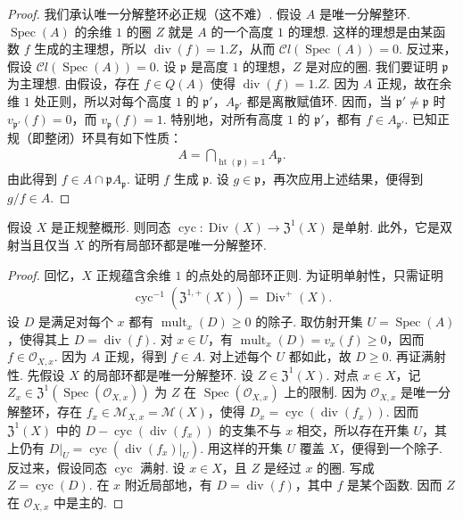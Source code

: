 \begin{proof}
我们承认唯一分解整环必正规（这不难）. 假设 $A$ 是唯一分解整环. $\operatorname{Spec}(A)$ 的余维 $1$ 的圈 $Z$ 就是 $A$ 的一个高度 $1$ 的理想. 这样的理想是由某函数 $f$ 生成的主理想，所以 $\operatorname{div}(f)=1.Z$，从而 $\mathcal Cl(\operatorname{Spec}(A))=0$.
反过来，假设 $\mathcal Cl(\operatorname{Spec}(A))=0$. 设 $\mathfrak p$ 是高度 $1$ 的理想，$Z$ 是对应的圈. 我们要证明 $\mathfrak p$ 为主理想. 由假设，存在 $f\in Q(A)$ 使得 $\operatorname{div}(f)=1.Z$. 因为 $A$ 正规，故在余维 $1$ 处正则，所以对每个高度 $1$ 的 $\mathfrak p'$，$A_{\mathfrak p'}$ 都是离散赋值环. 因而，当 $\mathfrak p'\ne\mathfrak p$ 时 $v_{\mathfrak p'}(f)=0$，而 $v_{\mathfrak p}(f)=1$. 特别地，对所有高度 $1$ 的 $\mathfrak p'$，都有 $f\in A_{\mathfrak p'}$. 已知正规（即整闭）环具有如下性质：
\begin{align*}
A=\bigcap_{\operatorname{ht}(\mathfrak p)=1}A_{\mathfrak p}.
\end{align*}
由此得到 $f\in A\cap\mathfrak pA_{\mathfrak p}$. 证明 $f$ 生成 $\mathfrak p$. 设 $g\in\mathfrak p$，再次应用上述结果，便得到 $g/f\in A$.
\end{proof}
\begin{theorem}\label{item:ag-1-3-7}
假设 $X$ 是正规整概形. 则同态 $\operatorname{cyc}:\operatorname{Div}(X)\longrightarrow\mathfrak Z^1(X)$ 是单射. 此外，它是双射当且仅当 $X$ 的所有局部环都是唯一分解整环.
\end{theorem}
\begin{proof}
回忆，$X$ 正规蕴含余维 $1$ 的点处的局部环正则. 为证明单射性，只需证明
\begin{align*}
\operatorname{cyc}^{-1}(\mathfrak Z^{1,+}(X))=\operatorname{Div}^+(X).
\end{align*}
设 $D$ 是满足对每个 $x$ 都有 $\operatorname{mult}_x(D)\geqslant0$ 的除子. 取仿射开集 $U=\operatorname{Spec}(A)$，使得其上 $D=\operatorname{div}(f)$. 对 $x\in U$，有 $\operatorname{mult}_x(D)=v_x(f)\geqslant0$，因而 $f\in\mathcal O_{X,x}$. 因为 $A$ 正规，得到 $f\in A$. 对上述每个 $U$ 都如此，故 $D\geqslant0$.
再证满射性. 先假设 $X$ 的局部环都是唯一分解整环. 设 $Z\in\mathfrak Z^1(X)$. 对点 $x\in X$，记 $Z_x\in\mathfrak Z^1(\operatorname{Spec}(\mathcal O_{X,x}))$ 为 $Z$ 在 $\operatorname{Spec}(\mathcal O_{X,x})$ 上的限制. 因为 $\mathcal O_{X,x}$ 是唯一分解整环，存在 $f_x\in\mathcal M_{X,x}=\mathcal M(X)$，使得 $D_x=\operatorname{cyc}(\operatorname{div}(f_x))$. 因而 $\mathfrak Z^1(X)$ 中的 $D-\operatorname{cyc}(\operatorname{div}(f_x))$ 的支集不与 $x$ 相交，所以存在开集 $U$，其上仍有 $D|_U=\operatorname{cyc}(\operatorname{div}(f_x)|_U)$. 用这样的开集 $U$ 覆盖 $X$，便得到一个除子.
反过来，假设同态 $\operatorname{cyc}$ 满射. 设 $x\in X$，且 $Z$ 是经过 $x$ 的圈. 写成 $Z=\operatorname{cyc}(D)$. 在 $x$ 附近局部地，有 $D=\operatorname{div}(f)$，其中 $f$ 是某个函数. 因而 $Z$ 在 $\mathcal O_{X,x}$ 中是主的.
\end{proof}
